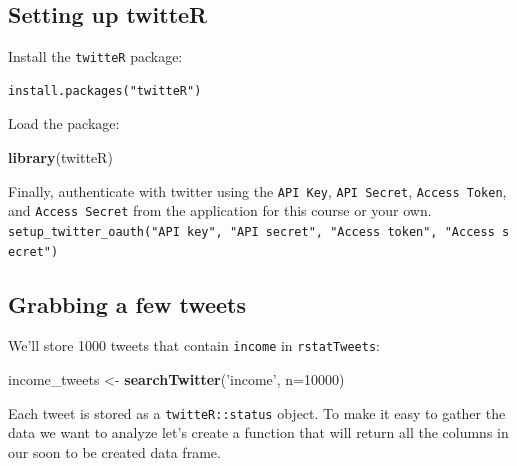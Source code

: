 \documentclass[]{book}
\newenvironment{Shaded}{\begin{snugshade}}{\end{snugshade}}
\newcommand{\KeywordTok}[1]{\textcolor[rgb]{0.13,0.29,0.53}{\textbf{{#1}}}}
\newcommand{\DataTypeTok}[1]{\textcolor[rgb]{0.13,0.29,0.53}{{#1}}}
\newcommand{\DecValTok}[1]{\textcolor[rgb]{0.00,0.00,0.81}{{#1}}}
\newcommand{\StringTok}[1]{\textcolor[rgb]{0.31,0.60,0.02}{{#1}}}
\newcommand{\NormalTok}[1]{{#1}}
\theoremstyle{definition}
\theoremstyle{definition}
\theoremstyle{remark}
\begin{document}
\subsection{Setting up twitteR}\label{setting-up-twitter}

Install the \texttt{twitteR} package:

\begin{verbatim}
install.packages("twitteR")
\end{verbatim}

Load the package:

\begin{Shaded}
\begin{Highlighting}[]
\KeywordTok{library}\NormalTok{(twitteR)}
\end{Highlighting}
\end{Shaded}

Finally, authenticate with twitter using the \texttt{API\ Key},
\texttt{API\ Secret}, \texttt{Access\ Token}, and
\texttt{Access\ Secret} from the application for this course or your
own.
\texttt{setup\_twitter\_oauth("API\ key",\ "API\ secret",\ "Access\ token",\ "Access\ secret")}

\subsection{Grabbing a few tweets}\label{grabbing-a-few-tweets}

We'll store 1000 tweets that contain \texttt{income} in
\texttt{rstatTweets}:

\begin{Shaded}
\begin{Highlighting}[]
\NormalTok{income_tweets <-}\StringTok{ }\KeywordTok{searchTwitter}\NormalTok{(}\StringTok{'income'}\NormalTok{, }\DataTypeTok{n=}\DecValTok{10000}\NormalTok{)}
\end{Highlighting}
\end{Shaded}

Each tweet is stored as a \texttt{twitteR::status} object. To make it
easy to gather the data we want to analyze let's create a function that
will return all the columns in our soon to be created data frame.

\begin{Shaded}
\end{Shaded}
\end{document}
